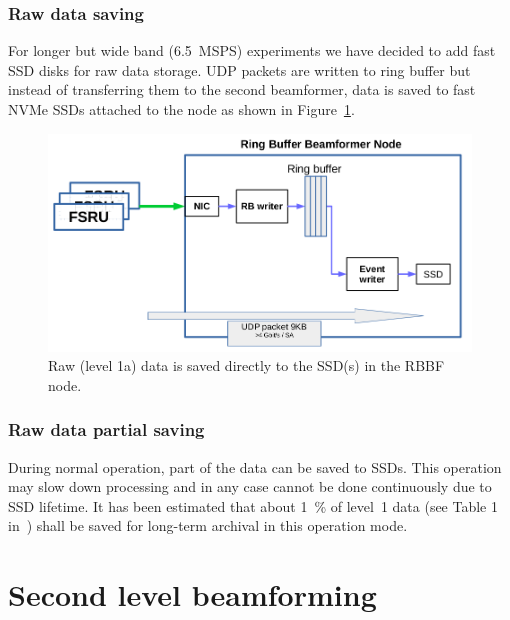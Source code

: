 \documentclass[12pt,a4paper]{article}
\begin{document}
\subsubsection{Raw data saving}
For longer but wide band (6.5~MSPS) experiments we have decided to add fast SSD disks for raw data storage. UDP packets are written to ring buffer but instead of transferring them to the second beamformer, data is saved to fast NVMe SSDs attached to the node as shown in Figure~\ref{rb-raw-data-save}.
\begin{figure}[h!]
\centering
\includegraphics[scale=0.5]{E3DDS_D2_Figure_6.png}
\caption{
Raw (level 1a) data is saved directly to the SSD(s) in the RBBF node.\label{rb-raw-data-save}}
\end{figure}

\subsubsection{Raw data partial saving}
During normal operation, part of the \fsru{} data can be saved to SSDs. This operation may slow down processing and in any case cannot be done continuously due to SSD lifetime.
It has been estimated that about 1~\% of level~1 data (see Table 1 in~\cite{e3dds-del1}) shall be saved for long-term archival in this operation mode.

\section{Second level beamforming}
\label{sec:sbf-phase}
\end{document}
